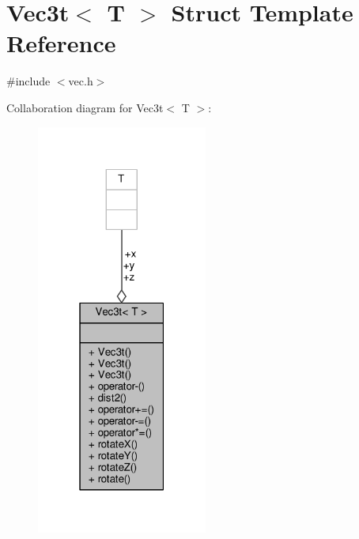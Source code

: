 \hypertarget{structVec3t}{}\section{Vec3t$<$ T $>$ Struct Template Reference}
\label{structVec3t}


{\ttfamily \#include $<$vec.\+h$>$}



Collaboration diagram for Vec3t$<$ T $>$\+:\nopagebreak
\begin{figure}[H]
\begin{center}
\leavevmode
\includegraphics[width=159pt]{structVec3t__coll__graph}
\end{center}
\end{figure}
